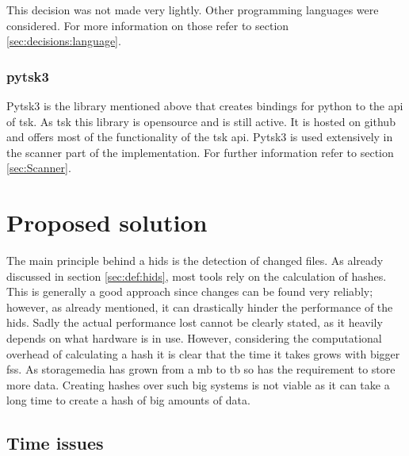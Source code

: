 This decision was not made very lightly. Other programming languages were considered. For more information on those refer to section \ref{sec:decisions:language}.

\subsubsection{pytsk3}
\label{sec:pytsk3}

Pytsk3 is the library mentioned above that creates bindings for python to the \gls{api} of \gls{tsk}. As \gls{tsk} this library is \gls{opensource} and is still active. It is hosted on \gls{github} and offers most of the functionality of the \gls{tsk} \gls{api}. Pytsk3 is used extensively in the scanner part of the implementation. For further information refer to section \ref{sec:Scanner}.

\section{Proposed solution}
\label{sec:hids}

The main principle behind a \gls{hids} is the detection of changed files. As already discussed in section \ref{sec:def:hids}, most tools rely on the calculation of hashes. This is generally a good approach since changes can be found very reliably; however, as already mentioned, it can drastically hinder the performance of the \gls{hids}. Sadly the actual performance lost cannot be clearly stated, as it heavily depends on what hardware is in use. However, considering the computational overhead of calculating a \gls{hash} it is clear that the time it takes grows with bigger \glspl{fs}. As \gls{storagemedia} has grown from a \gls{mb} to \gls{tb} so has the requirement to store more data. Creating hashes over such big systems is not viable as it can take a long time to create a hash of big amounts of data. \cite{hash:slow, hash:veryslow, hash:speed}

\subsection{Time issues}

